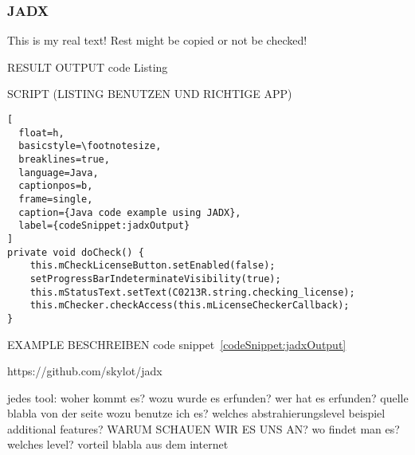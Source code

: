 \subsubsection{JADX} \label{subsection:forensics-tools-java-jadx}
This is my real text! Rest might be copied or not be checked!

RESULT OUTPUT
code Listing

SCRIPT (LISTING BENUTZEN UND RICHTIGE APP)


\begin{lstlisting}[
  float=h,
  basicstyle=\footnotesize,
  breaklines=true,
  language=Java,
  captionpos=b,
  frame=single,
  caption={Java code example using JADX},
  label={codeSnippet:jadxOutput}
]
private void doCheck() {
    this.mCheckLicenseButton.setEnabled(false);
    setProgressBarIndeterminateVisibility(true);
    this.mStatusText.setText(C0213R.string.checking_license);
    this.mChecker.checkAccess(this.mLicenseCheckerCallback);
}
\end{lstlisting}
EXAMPLE BESCHREIBEN code snippet~\ref{codeSnippet:jadxOutput}


https://github.com/skylot/jadx


jedes tool:\newline
woher kommt es?\newline
wozu wurde es erfunden?\newline
wer hat es erfunden? quelle\newline
blabla von der seite\newline
wozu benutze ich es?\newline
welches abstrahierungslevel\newline
beispiel\newline
additional features?\newline
WARUM SCHAUEN WIR ES UNS AN?\newline
wo findet man es?\newline
welches level?\newline
vorteil\newline
blabla aus dem internet\newline
